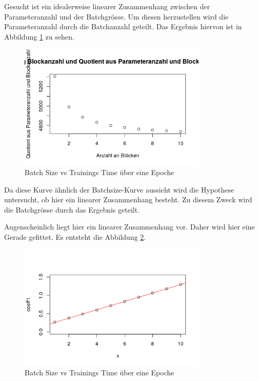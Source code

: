 Gesucht ist ein idealerweise linearer Zusammenhang zwischen der Parameteranzahl und der Batchgrösse. Um diesen herzustellen wird die Parameteranzahl durch die Batchanzahl geteilt. Das Ergebnis hiervon ist in Abbildung \ref{fig:quotient} zu sehen.

\begin{figure}[h]
 \centering
 \includegraphics[width=0.8\textwidth]{KapitelPartB/Images/quotient.png}
 \caption{Batch Size vs Trainings Time über eine Epoche}
 \label{fig:quotient}
\end{figure}


Da diese Kurve ähnlich der Batchsize-Kurve aussieht wird die Hypothese untersucht, ob hier ein linearer Zusammenhang besteht. Zu diesem Zweck wird die Batchgrösse durch das Ergebnis geteilt.

Augenscheinlich liegt hier ein linearer Zusammenhang vor. Daher wird hier eine Gerade gefittet.
Es entsteht die Abbildung \ref{fig:gerade}.

\begin{figure}[h]
 \centering
 \includegraphics[width=0.8\textwidth]{KapitelPartB/Images/gerade.png}
 \caption{Batch Size vs Trainings Time über eine Epoche}
 \label{fig:gerade}
\end{figure}




